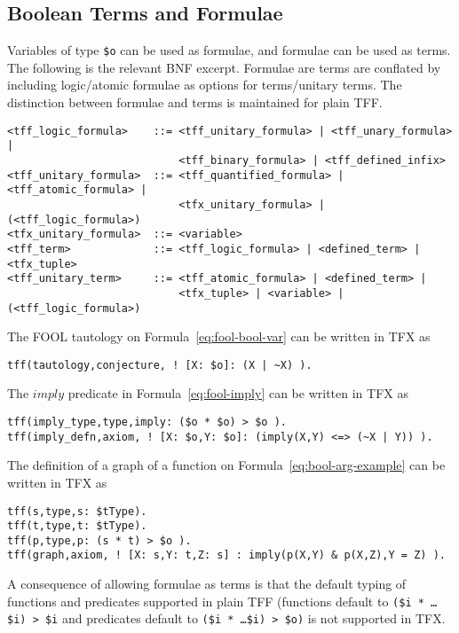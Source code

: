 \documentclass{easychair}
\begin{document}
\subsection{Boolean Terms and Formulae}

Variables of type {\tt \$o} can be used as formulae, and formulae can be 
used as terms. 
The following is the relevant BNF excerpt.
Formulae are terms are conflated by including logic/atomic formulae as
options for terms/unitary terms.
The distinction between formulae and terms is maintained for plain TFF.
\begin{verbatim}
<tff_logic_formula>    ::= <tff_unitary_formula> | <tff_unary_formula> |
                           <tff_binary_formula> | <tff_defined_infix>
<tff_unitary_formula>  ::= <tff_quantified_formula> | <tff_atomic_formula> |
                           <tfx_unitary_formula> | (<tff_logic_formula>)
<tfx_unitary_formula>  ::= <variable>
<tff_term>             ::= <tff_logic_formula> | <defined_term> | <tfx_tuple>
<tff_unitary_term>     ::= <tff_atomic_formula> | <defined_term> |
                           <tfx_tuple> | <variable> | (<tff_logic_formula>)
\end{verbatim}

The FOOL tautology on Formula~\ref{eq:fool-bool-var} can be written in TFX as
\begin{verbatim}
tff(tautology,conjecture, ! [X: $o]: (X | ~X) ).
\end{verbatim}

The $\mathit{imply}$ predicate in Formula~\ref{eq:fool-imply} can 
be written in TFX as
\begin{verbatim}
tff(imply_type,type,imply: ($o * $o) > $o ).
tff(imply_defn,axiom, ! [X: $o,Y: $o]: (imply(X,Y) <=> (~X | Y)) ).
\end{verbatim}


The definition of a graph of a function on Formula~\ref{eq:bool-arg-example} can be written in TFX as
\begin{verbatim}
tff(s,type,s: $tType).
tff(t,type,t: $tType).
tff(p,type,p: (s * t) > $o ).
tff(graph,axiom, ! [X: s,Y: t,Z: s] : imply(p(X,Y) & p(X,Z),Y = Z) ).
\end{verbatim}

A consequence of allowing formulae as terms is that the default typing of 
functions and predicates supported in plain TFF (functions default to 
{\tt (\$i * \ldots * \$i) > \$i} and predicates default to 
{\tt (\$i * \ldots * \$i) > \$o)} is not supported in TFX.
\end{document}
